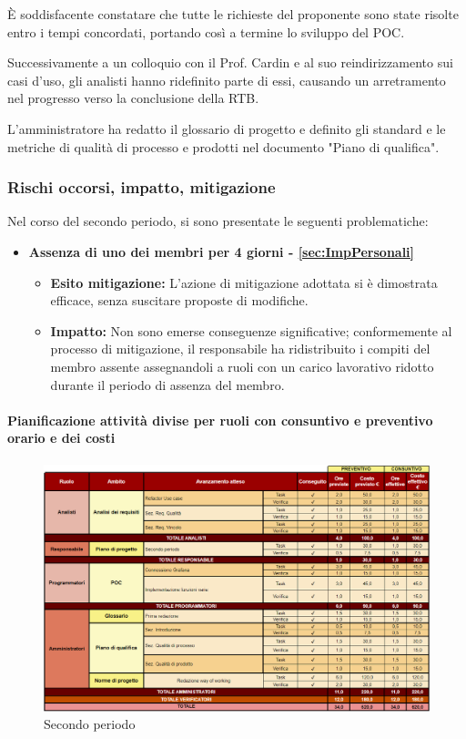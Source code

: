 È soddisfacente constatare che tutte le richieste del proponente sono state risolte entro i tempi concordati, portando così a termine lo sviluppo del POC.

Successivamente a un colloquio con il Prof. Cardin e al suo reindirizzamento sui casi d'uso, gli analisti hanno ridefinito parte di essi, causando un arretramento nel progresso verso la conclusione della RTB.

L'amministratore ha redatto il glossario di progetto e definito gli standard e le metriche di qualità di processo e prodotti nel documento "Piano di qualifica".

\subsubsection*{Rischi occorsi, impatto, mitigazione} 

Nel corso del secondo periodo, si sono presentate le seguenti problematiche:
\begin{itemize}
    \item \textbf{Assenza di uno dei membri per 4 giorni - \ref{sec:ImpPersonali}}
    \begin{itemize}
        \item \textbf{Esito mitigazione:} 
        L'azione di mitigazione adottata si è dimostrata efficace, senza suscitare proposte di modifiche.
        \item \textbf{Impatto:}
        Non sono emerse conseguenze significative; conformemente al processo di mitigazione, il responsabile ha ridistribuito i compiti del membro assente assegnandoli a ruoli con un carico lavorativo ridotto durante il periodo di assenza del membro.
        \end{itemize}
\end{itemize}

\newpage
\paragraph{Pianificazione attività divise per ruoli con consuntivo e preventivo orario e dei costi}\hspace{1pt}

\begin{figure}[H]
    \centering
    \includegraphics[width=\linewidth, height=0.9\textheight, keepaspectratio]{../Images/periodo2.PNG}
    \caption{Secondo periodo}
    \label{fig:Secondo_periodo}
\end{figure}

